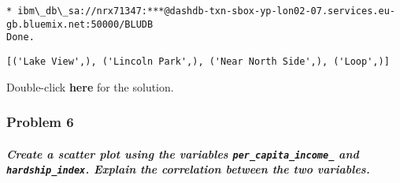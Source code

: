 \documentclass[11pt]{article}
\makeatletter
\newcommand{\boxspacing}{\kern\kvtcb@left@rule\kern\kvtcb@boxsep}
\newcommand{\prompt}[4]{
        \ttfamily\llap{{\color{#2}[#3]:\hspace{3pt}#4}}\vspace{-\baselineskip}
    }
\makeatother
\begin{document}
    \begin{Verbatim}[commandchars=\\\{\}]
 * ibm\_db\_sa://nrx71347:***@dashdb-txn-sbox-yp-lon02-07.services.eu-
gb.bluemix.net:50000/BLUDB
Done.
    \end{Verbatim}

            \begin{tcolorbox}[breakable, size=fbox, boxrule=.5pt, pad at break*=1mm, opacityfill=0]
\prompt{Out}{outcolor}{11}{\boxspacing}
\begin{Verbatim}[commandchars=\\\{\}]
[('Lake View',), ('Lincoln Park',), ('Near North Side',), ('Loop',)]
\end{Verbatim}
\end{tcolorbox}
        
    Double-click \textbf{here} for the solution.

    \hypertarget{problem-6}{%
\subsubsection{Problem 6}\label{problem-6}}

\hypertarget{create-a-scatter-plot-using-the-variables-per_capita_income_-and-hardship_index.-explain-the-correlation-between-the-two-variables.}{%
\subparagraph{\texorpdfstring{Create a scatter plot using the variables
\texttt{per\_capita\_income\_} and \texttt{hardship\_index}. Explain the
correlation between the two
variables.}{Create a scatter plot using the variables per\_capita\_income\_ and hardship\_index. Explain the correlation between the two variables.}}\label{create-a-scatter-plot-using-the-variables-per_capita_income_-and-hardship_index.-explain-the-correlation-between-the-two-variables.}}
\end{document}
